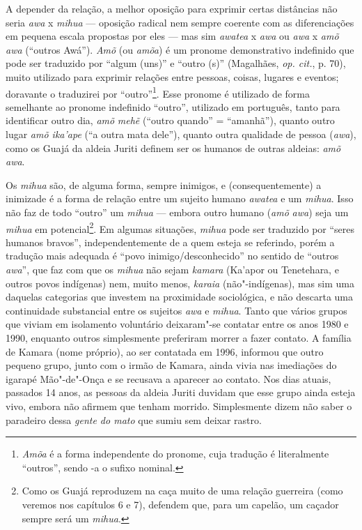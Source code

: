 A depender da relação, a melhor oposição para exprimir certas distâncias
não seria \emph{awa} x \emph{mihua} --- oposição radical nem sempre
coerente com as diferenciações em pequena escala propostas por eles ---
mas sim \emph{awatea} x \emph{awa} ou \emph{awa} x \emph{amõ awa}
(``outros Awá''). \emph{Amõ} (ou \emph{amõa}) é um pronome demonstrativo
indefinido que pode ser traduzido por ``algum (uns)'' e ``outro (s)''
(Magalhães, \emph{op. cit.}, p. 70), muito utilizado para exprimir relações
entre pessoas, coisas, lugares e eventos; doravante o traduzirei por
``outro''\footnote{\emph{Amõa} é a forma independente do pronome, cuja
  tradução é literalmente ``outros'', sendo -a o sufixo nominal.}. Esse
pronome é utilizado de forma semelhante ao pronome indefinido ``outro'',
utilizado em português, tanto para identificar outro dia, \emph{amõ}
\emph{mehẽ} (``outro quando'' = ``amanhã''), quanto outro lugar \emph{amõ
ika'ape} (``a outra mata dele''), quanto outra qualidade de pessoa
(\emph{awa}), como os Guajá da aldeia Juriti definem ser os humanos de
outras aldeias: \emph{amõ} \emph{awa}.

Os \emph{mihua} são, de alguma forma, sempre inimigos, e
(consequentemente) a inimizade é a forma de relação entre um sujeito
humano \emph{awatea} e um \emph{mihua}. Isso não faz de todo ``outro'' um
\emph{mihua} --- embora outro humano (\emph{amõ} \emph{awa}) seja um
\emph{mihua} em potencial\footnote{Como os Guajá reproduzem na caça
  muito de uma relação guerreira (como veremos nos capítulos 6 e 7),
  defendem que, para um capelão, um caçador sempre será um \emph{mihua}.}.
Em algumas situações, \emph{mihua} pode ser traduzido por ``seres humanos
bravos'', independentemente de a quem esteja se referindo, porém a
tradução mais adequada é ``povo inimigo/desconhecido'' no sentido de
``outros \emph{awa}'', que faz com que os \emph{mihua} não sejam
\emph{kamara} (Ka'apor ou Tenetehara, e outros povos indígenas) nem,
muito menos, \emph{karaia} (não"-indígenas), mas sim uma daquelas
categorias que investem na proximidade sociológica, e não descarta uma
continuidade substancial entre os sujeitos \emph{awa} e \emph{mihua}.
Tanto que vários grupos que viviam em isolamento voluntário deixaram"-se
contatar entre os anos 1980 e 1990, enquanto outros simplesmente
preferiram morrer a fazer contato. A família de Kamara (nome próprio),
ao ser contatada em 1996, informou que outro pequeno grupo, junto com o
irmão de Kamara, ainda vivia nas imediações do igarapé Mão"-de"-Onça e se
recusava a aparecer ao contato. Nos dias atuais, passados 14 anos, as
pessoas da aldeia Juriti duvidam que esse grupo ainda esteja vivo,
embora não afirmem que tenham morrido. Simplesmente dizem não saber o
paradeiro dessa \emph{gente do mato} que sumiu sem deixar rastro.

